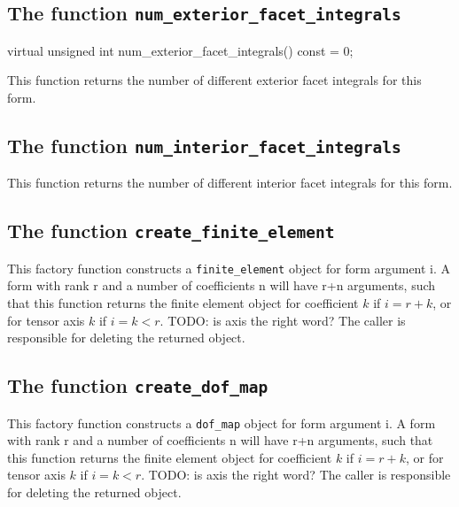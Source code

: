 \subsection{The function \texttt{num\_exterior\_facet\_integrals}}
\begin{code}
virtual unsigned int num_exterior_facet_integrals() const = 0;
\end{code}
This function returns the number of different exterior facet integrals for this form.



\subsection{The function \texttt{num\_interior\_facet\_integrals}}
This function returns the number of different interior facet integrals for this form.



\subsection{The function \texttt{create\_finite\_element}}
This factory function constructs a \texttt{finite\_element} object for form argument i.
A form with rank r and a number of coefficients n will have r+n arguments,
such that this function returns the finite element object for coefficient $k$ if $i=r+k$,
or for tensor axis $k$ if $i=k<r$. TODO: is axis the right word?
The caller is responsible for deleting the returned object.



\subsection{The function \texttt{create\_dof\_map}}
This factory function constructs a \texttt{dof\_map} object for form argument i.
A form with rank r and a number of coefficients n will have r+n arguments,
such that this function returns the finite element object for coefficient $k$ if $i=r+k$,
or for tensor axis $k$ if $i=k<r$. TODO: is axis the right word?
The caller is responsible for deleting the returned object.


